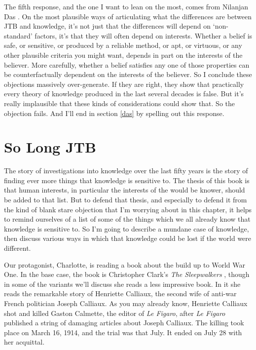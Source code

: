 \documentclass[
  11pt,
]{book}
\begin{document}
The fifth response, and the one I want to lean on the most, comes from Nilanjan Das \citeyearpar{DasThesis}. On the most plausible ways of articulating what the differences are between JTB and knowledge, it's not just that the differences will depend on `non-standard' factors, it's that they will often depend on interests. Whether a belief is safe, or sensitive, or produced by a reliable method, or apt, or virtuous, or any other plausible criteria you might want, depends in part on the interests of the believer. More carefully, whether a belief satisfies any one of those properties can be counterfactually dependent on the interests of the believer. So I conclude these objections massively over-generate. If they are right, they show that practically every theory of knowledge produced in the last several decades is false. But it's really implausible that these kinds of considerations could show that. So the objection fails. And I'll end in section \ref{das} by spelling out this response.

\hypertarget{gettier}{%
\section{So Long JTB}\label{gettier}}

The story of investigations into knowledge over the last fifty years is the story of finding ever more things that knowledge is sensitive to. The thesis of this book is that human interests, in particular the interests of the would be knower, should be added to that list. But to defend that thesis, and especially to defend it from the kind of blank stare objection that I'm worrying about in this chapter, it helps to remind ourselves of a list of some of the things which we all already know that knowledge is sensitive to. So I'm going to describe a mundane case of knowledge, then discuss various ways in which that knowledge could be lost if the world were different.

Our protagonist, Charlotte, is reading a book about the build up to World War One. In the base case, the book is Christopher Clark's \emph{The Sleepwalkers} \citep{Clark2012}, though in some of the variants we'll discuss she reads a less impressive book. In it she reads the remarkable story of Henriette Calliaux, the second wife of anti-war French politician Joseph Calliaux. As you may already know, Henriette Calliaux shot and killed Gaston Calmette, the editor of \emph{Le Figaro}, after \emph{Le Figaro} published a string of damaging articles about Joseph Calliaux. The killing took place on March 16, 1914, and the trial was that July. It ended on July 28 with her acquittal.
\end{document}
